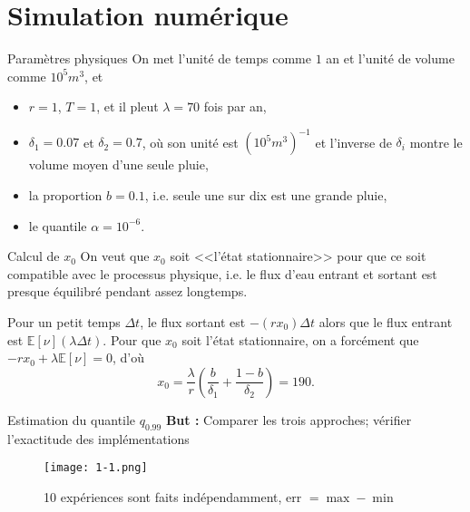 \documentclass{beamer}
\begin{document}
\section{Simulation numérique}
\begin{frame}{Paramètres physiques}
    On met l'unité de temps comme $1$ an et l'unité de volume comme $10^5m^3$, et
    \begin{itemize}
        \item $r=1$, $T=1$, et il pleut $\lambda=70$ fois par an,
        \item $\delta_1=0.07$ et $\delta_2=0.7$, où son unité est $(10^5m^3)^{-1}$ et l'inverse de $\delta_i$ montre le volume moyen d'une seule pluie,
        \item la proportion $b=0.1$, i.e. seule une sur dix est une grande pluie,
        \item le quantile $\alpha=10^{-6}$.
    \end{itemize}
\end{frame}
\begin{frame}{Calcul de $x_0$}
On veut que $x_0$ soit <<l'état stationnaire>> pour que ce soit compatible avec le processus physique, i.e. le flux d'eau entrant et sortant est presque équilibré pendant assez longtemps.\pause

Pour un petit temps $\Delta t$, le flux sortant est $-(r x_0)\Delta t$ alors que le flux entrant est $\mathbb E[\nu](\lambda\Delta t)$. Pour que $x_0$ soit l'état stationnaire, on a forcément que  $-rx_0+\lambda{\mathbb E[\nu]}=0$, d'où
\[x_0=\frac{\lambda}{r}\left(\frac{b}{\delta_1}+\frac{1-b}{\delta_2}\right)=190.\]
    
\end{frame}
\begin{frame}{Estimation du quantile $q_{0.99}$}
    \textbf{But :} Comparer les trois approches; vérifier l'exactitude des implémentations
    \begin{figure}
        \centering
        \texttt{[image: 1-1.png]}
        \caption{10 expériences sont faits indépendamment, err $=\max-\min$}
        \label{fig:enter-label}
    \end{figure}
\end{frame}
\end{document}
